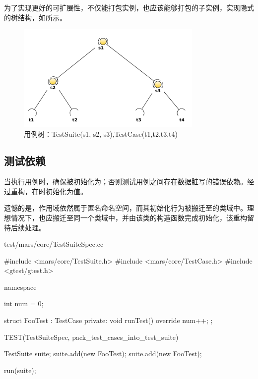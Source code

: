 \begin{content}

为了实现更好的可扩展性，不仅能打包实例，也应该能够打包的子实例，实现隐式的树结构，如所示。

\begin{figure}[H]
\centering
\includegraphics[width=0.8\textwidth]{figures/xunit/test-tree-example.png}
\caption{用例树：TestSuite(s1, s2, s3),TestCase(t1,t2,t3,t4)}
 \label{fig:test-case-tree}
\end{figure}

\subsection{测试依赖}

当执行用例时，确保被初始化为；否则测试用例之间存在数据脏写的错误依赖。经过重构，在时初始化为值。

遗憾的是，作用域依然属于匿名命名空间，而其初始化行为被搬迁至的类域中。理想情况下，也应搬迁至同一个类域中，并由该类的构造函数完成初始化，该重构留待后续处理。

\begin{diff}{test/mars/core/TestSuiteSpec.cc}
 \begin{minicpp}
#include <mars/core/TestSuite.h>
#include <mars/core/TestCase.h>
#include <gtest/gtest.h>

namespace {
  int num = 0;

  struct FooTest : TestCase {
  private:
    void runTest() override {
      num++;
    }
  };
}

TEST(TestSuiteSpec, pack_test_cases_into_test_suite) {
  TestSuite suite;
  suite.add(new FooTest);
  suite.add(new FooTest);

  run(suite);

}
\end{minicpp}
\end{diff}
\end{content}

